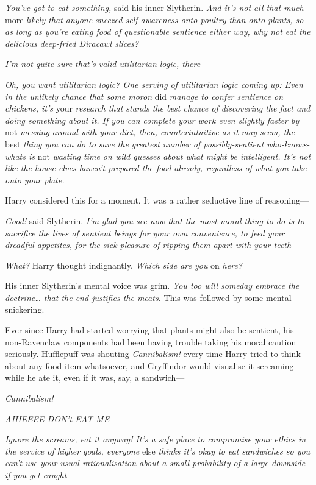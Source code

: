 \emph{You've got to eat something,} said his inner Slytherin. \emph{And
it's not all that much} more \emph{likely that anyone sneezed
self-awareness onto poultry than onto plants, so as long as you're
eating food of questionable sentience either way, why not eat the
delicious deep-fried Diracawl slices?}

\emph{I'm not quite sure that's valid utilitarian logic, there---}

\emph{Oh, you want utilitarian logic? One serving of utilitarian logic
coming up: Even in the unlikely chance that some moron} did \emph{manage
to confer sentience on chickens, it's} your \emph{research that stands
the best chance of discovering the fact and doing something about it. If
you can complete your work even slightly faster by} not \emph{messing
around with your diet, then, counterintuitive as it may seem, the} best
\emph{thing you can do to save the greatest number of possibly-sentient
who-knows-whats is} not \emph{wasting time on wild guesses about what
might be intelligent. It's not like the house elves haven't prepared the
food already, regardless of what you take onto your plate.}

Harry considered this for a moment. It was a rather seductive line of
reasoning---

\emph{Good!} said Slytherin. \emph{I'm glad you see now that the most
moral thing to do is to sacrifice the lives of sentient beings for your
own convenience, to feed your dreadful appetites, for the sick pleasure
of ripping them apart with your teeth---}

\emph{What?} Harry thought indignantly. \emph{Which side are you} on
\emph{here?}

His inner Slytherin's mental voice was grim. \emph{You too will someday
embrace the doctrine\ldots{} that the end justifies the meats.} This was
followed by some mental snickering.

Ever since Harry had started worrying that plants might also be
sentient, his non-Ravenclaw components had been having trouble taking
his moral caution seriously. Hufflepuff was shouting \emph{Cannibalism!}
every time Harry tried to think about any food item whatsoever, and
Gryffindor would visualise it screaming while he ate it, even if it was,
say, a sandwich---

\emph{Cannibalism!}

\emph{AIIIEEEE DON't EAT ME---}

\emph{Ignore the screams, eat it anyway! It's a safe place to compromise
your ethics in the service of higher goals, everyone} else \emph{thinks
it's okay to eat sandwiches so you can't use your usual rationalisation
about a small probability of a large downside if you get caught---}

